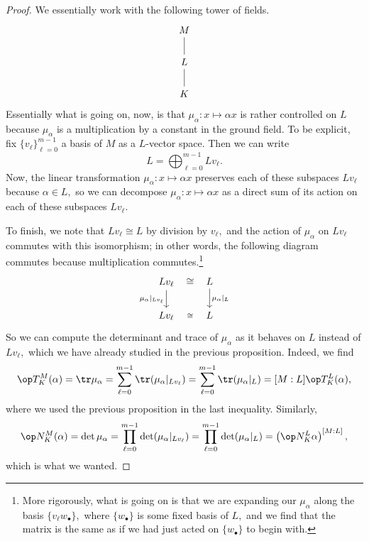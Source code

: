 \begin{proof}
	We essentially work with the following tower of fields.
	\[\begin{tikzcd}
		M \\
		L \\
		K
		\arrow[no head, from=3-1, to=2-1]
		\arrow[no head, from=2-1, to=1-1]
	\end{tikzcd}\]
	Essentially what is going on, now, is that $\mu_\alpha:x\mapsto \alpha x$ is rather controlled on $L$ because $\mu_\alpha$ is a multiplication by a constant in the ground field. To be explicit, fix $\{v_\ell\}_{\ell=0}^{m-1}$ a basis of $M$ as a $L$-vector space. Then we can write
	\[L=\bigoplus_{\ell=0}^{m-1}Lv_\ell.\]
	Now, the linear transformation $\mu_\alpha:x\mapsto \alpha x$ preserves each of these subspaces $Lv_\ell$ because $\alpha\in L,$ so we can decompose $\mu_\alpha:x\mapsto \alpha x$ as a direct sum of its action on each of these subspaces $Lv_\ell.$

	To finish, we note that $Lv_\ell\cong L$ by division by $v_\ell,$ and the action of $\mu_\alpha$ on $Lv_\ell$ commutes with this isomorphism; in other words, the following diagram commutes because multiplication commutes.\footnote{More rigorously, what is going on is that we are expanding our $\mu_\alpha$ along the basis $\{v_\ell w_\bullet\},$ where $\{w_\bullet\}$ is some fixed basis of $L,$ and we find that the matrix is the same as if we had just acted on $\{w_\bullet\}$ to begin with.}
	\[\begin{tikzcd}
		{Lv_\ell} & {L} \\
		{Lv_\ell} & {L}
		\arrow["{\mu_\alpha|_{Lv_\ell}}"', from=1-1, to=2-1]
		\arrow["\cong"{marking}, draw=none, from=1-1, to=1-2]
		\arrow["\cong"{description}, draw=none, from=2-1, to=2-2]
		\arrow["{\mu_\alpha|_L}", from=1-2, to=2-2]
	\end{tikzcd}\]
	So we can compute the determinant and trace of $\mu_\alpha$ as it behaves on $L$ instead of $Lv_\ell,$ which we have already studied in the previous proposition. Indeed, we find
	\[\op T^M_K(\alpha)=\tr\mu_\alpha=\sum_{\ell=0}^{m-1}\tr(\mu_\alpha|_{Lv_\ell})=\sum_{\ell=0}^{m-1}\tr(\mu_\alpha|_L)=[M:L]\op T^L_K(\alpha),\]
	where we used the previous proposition in the last inequality. Similarly,
	\[\op N^M_K(\alpha)=\det\mu_\alpha=\prod_{\ell=0}^{m-1}\det(\mu_\alpha|_{Lv_\ell})=\prod_{\ell=0}^{m-1}\det(\mu_\alpha|_L)=\left(\op N^L_K\alpha\right)^{[M:L]},\]
	which is what we wanted.
\end{proof}
